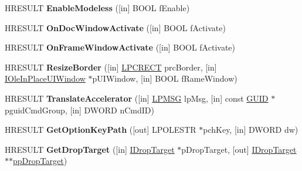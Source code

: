 \begin{DoxyCompactItemize}
H\+R\+E\+S\+U\+LT {\bfseries Enable\+Modeless} (\mbox{[}in\mbox{]} B\+O\+OL f\+Enable)
\item 
\mbox{\label{interface_i_doc_host_u_i_handler_a404677d3d2467812defa0366e94c394b}} 
H\+R\+E\+S\+U\+LT {\bfseries On\+Doc\+Window\+Activate} (\mbox{[}in\mbox{]} B\+O\+OL f\+Activate)
\item 
\mbox{\label{interface_i_doc_host_u_i_handler_a761f93da16436e68e8cc7987a555cbdd}} 
H\+R\+E\+S\+U\+LT {\bfseries On\+Frame\+Window\+Activate} (\mbox{[}in\mbox{]} B\+O\+OL f\+Activate)
\item 
\mbox{\label{interface_i_doc_host_u_i_handler_a9ea285e54acb50c8f64f07139cf5a2ea}} 
H\+R\+E\+S\+U\+LT {\bfseries Resize\+Border} (\mbox{[}in\mbox{]} \hyperlink{structtag_r_e_c_t}{L\+P\+C\+R\+E\+CT} prc\+Border, \mbox{[}in\mbox{]} \hyperlink{interface_i_ole_in_place_u_i_window}{I\+Ole\+In\+Place\+U\+I\+Window} $\ast$p\+U\+I\+Window, \mbox{[}in\mbox{]} B\+O\+OL f\+Rame\+Window)
\item 
\mbox{\label{interface_i_doc_host_u_i_handler_abd2a9cb1566c8bfccc275e4de760887c}} 
H\+R\+E\+S\+U\+LT {\bfseries Translate\+Accelerator} (\mbox{[}in\mbox{]} \hyperlink{structtag_m_s_g}{L\+P\+M\+SG} lp\+Msg, \mbox{[}in\mbox{]} const \hyperlink{interface_g_u_i_d}{G\+U\+ID} $\ast$pguid\+Cmd\+Group, \mbox{[}in\mbox{]} D\+W\+O\+RD n\+Cmd\+ID)
\item 
\mbox{\label{interface_i_doc_host_u_i_handler_a34f7322bb036b4bbe542683d8bf354ba}} 
H\+R\+E\+S\+U\+LT {\bfseries Get\+Option\+Key\+Path} (\mbox{[}out\mbox{]} L\+P\+O\+L\+E\+S\+TR $\ast$pch\+Key, \mbox{[}in\mbox{]} D\+W\+O\+RD dw)
\item 
\mbox{\label{interface_i_doc_host_u_i_handler_a3b7f11fecf26eca64218c61514081b0c}} 
H\+R\+E\+S\+U\+LT {\bfseries Get\+Drop\+Target} (\mbox{[}in\mbox{]} \hyperlink{interface_i_drop_target}{I\+Drop\+Target} $\ast$p\+Drop\+Target, \mbox{[}out\mbox{]} \hyperlink{interface_i_drop_target}{I\+Drop\+Target} $\ast$$\ast$\hyperlink{interface_i_drop_target}{pp\+Drop\+Target})
\item 
\mbox{\label{interface_i_doc_host_u_i_handler_a315c010bfd4cc585f5e25cbc63f91604}} 
$$
\end{DoxyCompactItemize}
